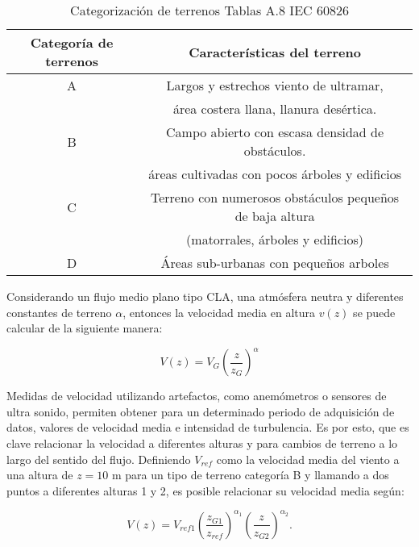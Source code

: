 \begin{table}[h] 
	\begin{footnotesize} 
		\begin{center} 
			\begin{tabular}{|c||c|}
				\hline
				\textbf{Categoría de terrenos}& \textbf{Características del terreno}  \\\hline
				A & Largos y estrechos viento de ultramar,  \\
				& área costera llana, llanura desértica.    \\ \hline
				B & Campo abierto con escasa densidad de obstáculos. \\
				& áreas cultivadas con pocos árboles y edificios     \\ \hline
				C &  Terreno con numerosos obstáculos pequeños de baja altura \\
				& (matorrales, árboles y edificios)  \\ \hline
				D & Áreas sub-urbanas con pequeños arboles     \\ \hline
			\end{tabular}
		\end{center} 
		\caption{Categorización de terrenos Tablas A.8 IEC 60826}
	\end{footnotesize} 
	\label{TablaTerrenos} 
\end{table}

Considerando un flujo medio plano tipo CLA, una atmósfera neutra y diferentes constantes de terreno $\alpha$, entonces la velocidad media en altura $v(z)$ se puede calcular de la siguiente manera:

\begin{equation}\label{LeyPotencial}
	V(z)=V_{G}\left(\frac{z}{z_{G}}\right)^\alpha
\end{equation}

Medidas de velocidad utilizando artefactos, como anemómetros o sensores de ultra sonido, permiten obtener para un determinado periodo de adquisición de datos, valores de velocidad media e intensidad de turbulencia. Es por esto, que es clave relacionar la velocidad a diferentes alturas y para cambios de terreno a lo largo del sentido del flujo. Definiendo $V_{ref}$ como la velocidad media del viento a una altura de $z=10$ m para un tipo de terreno categoría B y llamando a dos puntos a diferentes alturas 1 y 2, es posible relacionar su velocidad media según:

\begin{equation}\label{RelacionPotencial}
	V(z)=V_{ref1}\left(\frac{z_{G1}}{z_{ref}}\right)^{\alpha_1}\left(\frac{z}{z_{G2}}\right)^{\alpha_2}.
\end{equation}

